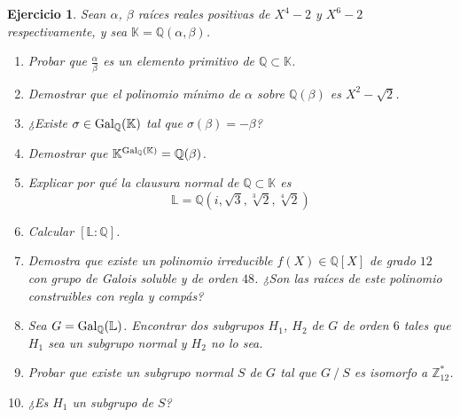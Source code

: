 \documentclass[11pt]{report}
\newcommand{\Z}{\mathbb Z}
\newcommand{\Q}{\mathbb Q}
\newcommand{\K}{\mathbb K}
\renewcommand{\L}{\mathbb L}
\newtheorem{ejercicio}{Ejercicio}
\begin{document}
\begin{ejercicio}
    Sean $\alpha$, $\beta$ raíces reales positivas de $X^4-2$ y $X^6-2$ respectivamente, y sea $\K = \Q(\alpha,\beta)$.
    \begin{enumerate}
        \item Probar que $\frac{\alpha}{\beta}$ es un elemento primitivo de $\Q \subset \K$.
        \item Demostrar que el polinomio mínimo de $\alpha$ sobre $\Q(\beta)$ es $X^2-\sqrt{2}$.
        \item ¿Existe $\sigma \in \textup{Gal}_\Q(\K)$ tal que $\sigma(\beta) = -\beta$?
        \item Demostrar que $\K^{\textup{Gal}_\Q(\K)} = \Q(\beta)$.
        \item Explicar por qué la clausura normal de $\Q \subset \K$ es
        \[\L = \Q(i,\sqrt{3},\sqrt[3]{2}, \sqrt[4]{2})\]
        \item Calcular $[\L \colon \Q]$.
        \item Demostra que existe un polinomio irreducible $f(X) \in \Q[X]$ de grado $12$ con grupo de Galois soluble y de orden $48$. ¿Son las raíces de este polinomio construibles con regla y compás?
        \item Sea $G = \textup{Gal}_{\Q}(\L)$. Encontrar dos subgrupos $H_1$, $H_2$ de $G$ de orden $6$ tales que $H_1$ sea un subgrupo normal y $H_2$ no lo sea.
        \item Probar que existe un subgrupo normal $S$ de $G$ tal que $G \ / \ S$ es isomorfo a $\Z_{12}^*$.
        \item ¿Es $H_1$ un subgrupo de $S$?  
    \end{enumerate}
\end{ejercicio}
\end{document}

